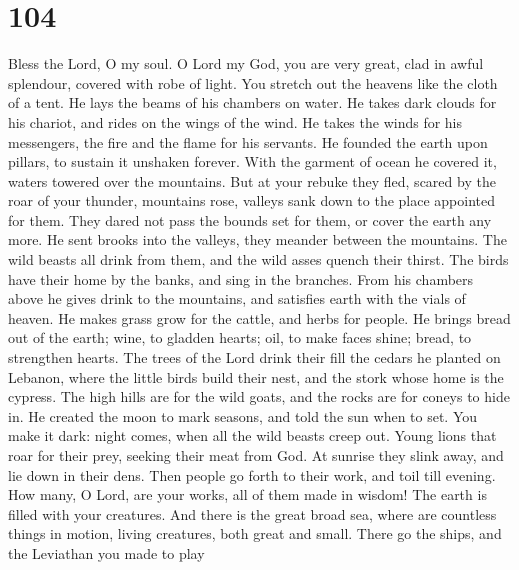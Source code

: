 \hypertarget{section-103}{%
\section{104}\label{section-103}}

 Bless the Lord, O my soul. O Lord my God, you are very
great, clad in awful splendour,  covered with robe of light.
You stretch out the heavens like the cloth of a tent.  He
lays the beams of his chambers on water. He takes dark clouds for his
chariot, and rides on the wings of the wind.  He takes the
winds for his messengers, the fire and the flame for his servants.
 He founded the earth upon pillars, to sustain it unshaken
forever.  With the garment of ocean he covered it, waters
towered over the mountains.  But at your rebuke they fled,
scared by the roar of your thunder,  mountains rose, valleys
sank down to the place appointed for them.  They dared not
pass the bounds set for them, or cover the earth any more. 
He sent brooks into the valleys, they meander between the mountains.
 The wild beasts all drink from them, and the wild asses
quench their thirst.  The birds have their home by the
banks, and sing in the branches.  From his chambers above
he gives drink to the mountains, and satisfies earth with the vials of
heaven.  He makes grass grow for the cattle, and herbs for
people. He brings bread out of the earth;  wine, to gladden
hearts; oil, to make faces shine; bread, to strengthen hearts.
 The trees of the Lord drink their fill the cedars he
planted on Lebanon,  where the little birds build their
nest, and the stork whose home is the cypress.  The high
hills are for the wild goats, and the rocks are for coneys to hide in.
 He created the moon to mark seasons, and told the sun when
to set.  You make it dark: night comes, when all the wild
beasts creep out.  Young lions that roar for their prey,
seeking their meat from God.  At sunrise they slink away,
and lie down in their dens.  Then people go forth to their
work, and toil till evening.  How many, O Lord, are your
works, all of them made in wisdom! The earth is filled with your
creatures.  And there is the great broad sea, where are
countless things in motion, living creatures, both great and small.
 There go the ships, and the Leviathan you made to play
